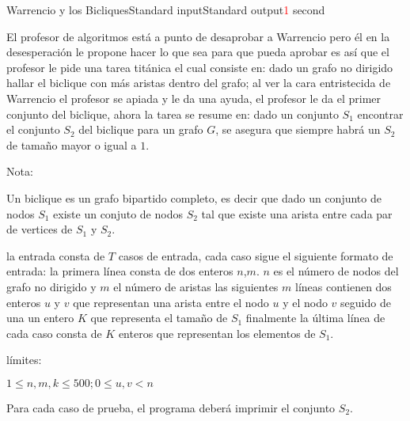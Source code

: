 \begin{problem}{Warrencio y los Bicliques}{Standard input}{Standard output}{\textcolor{red}{1} second}{}


El profesor de algoritmos está a punto de desaprobar a Warrencio pero él en la desesperación le propone hacer lo que sea para que pueda aprobar es así que el profesor le pide una tarea titánica el cual consiste en: dado un grafo no dirigido hallar el biclique con más aristas dentro del grafo; al ver la cara entristecida de Warrencio el profesor se apiada  y le da una ayuda, el profesor le da el primer conjunto del biclique, ahora la tarea se resume en: dado un conjunto $S_1$ encontrar el conjunto $S_2$ del biclique para un grafo $G$, se asegura que siempre habrá un $S_2$ de tamaño mayor o igual a $1$. 

Nota:

Un biclique es un grafo bipartido completo, es decir que dado un conjunto de nodos $S_1$ existe un conjuto de nodos $S_2$ tal que existe una arista entre cada par de vertices de $S_1$ y $S_2$.

\InputFile
la entrada consta de $T$ casos de entrada, cada caso sigue el siguiente formato de entrada: 
la primera línea consta de dos  enteros $n$,$m$. $n$ es el número de nodos del grafo no dirigido y $m$ el número de aristas las siguientes $m$ líneas contienen dos enteros $u$ y $v$ que representan una arista entre el nodo $u$ y el nodo $v$ seguido de una un entero $K$ que representa el tamaño de $S_1$ finalmente la última línea de cada caso consta de $K$ enteros que representan los elementos de $S_1$. 

límites:

$1 \leq n,m,k \leq 500; 0 \leq u,v<n $ 

\OutputFile
Para cada caso de prueba, el programa deberá imprimir el conjunto $S_2$.

\Example

\begin{example}
\end{example}

\end{problem}
